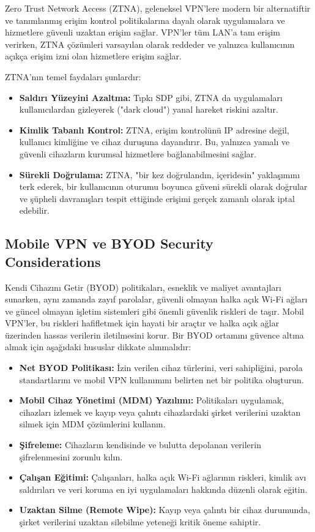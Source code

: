 Zero Trust Network Access (ZTNA), geleneksel VPN'lere modern bir alternatiftir ve tanımlanmış erişim kontrol politikalarına dayalı olarak uygulamalara ve hizmetlere güvenli uzaktan erişim sağlar. VPN'ler tüm LAN'a tam erişim verirken, ZTNA çözümleri varsayılan olarak reddeder ve yalnızca kullanıcının açıkça erişim izni olan hizmetlere erişim sağlar.

ZTNA'nın temel faydaları şunlardır:

\begin{itemize}
\item \textbf{Saldırı Yüzeyini Azaltma:} Tıpkı SDP gibi, ZTNA da uygulamaları kullanıcılardan gizleyerek ("dark cloud") yanal hareket riskini azaltır.
\item \textbf{Kimlik Tabanlı Kontrol:} ZTNA, erişim kontrolünü IP adresine değil, kullanıcı kimliğine ve cihaz duruşuna dayandırır. Bu, yalnızca yamalı ve güvenli cihazların kurumsal hizmetlere bağlanabilmesini sağlar.
\item \textbf{Sürekli Doğrulama:} ZTNA, "bir kez doğrulandın, içeridesin" yaklaşımını terk ederek, bir kullanıcının oturumu boyunca güveni sürekli olarak doğrular ve şüpheli davranışları tespit ettiğinde erişimi gerçek zamanlı olarak iptal edebilir.
\end{itemize}

\subsection{Mobile VPN ve BYOD Security Considerations}

Kendi Cihazını Getir (BYOD) politikaları, esneklik ve maliyet avantajları sunarken, aynı zamanda zayıf parolalar, güvenli olmayan halka açık Wi-Fi ağları ve güncel olmayan işletim sistemleri gibi önemli güvenlik riskleri de taşır. Mobil VPN'ler, bu riskleri hafifletmek için hayati bir araçtır ve halka açık ağlar üzerinden hassas verilerin iletilmesini korur.
Bir BYOD ortamını güvence altına almak için aşağıdaki hususlar dikkate alınmalıdır:

\begin{itemize}
\item \textbf{Net BYOD Politikası:} İzin verilen cihaz türlerini, veri sahipliğini, parola standartlarını ve mobil VPN kullanımını belirten net bir politika oluşturun.
\item \textbf{Mobil Cihaz Yönetimi (MDM) Yazılımı:} Politikaları uygulamak, cihazları izlemek ve kayıp veya çalıntı cihazlardaki şirket verilerini uzaktan silmek için MDM çözümlerini kullanın.
\item \textbf{Şifreleme:} Cihazların kendisinde ve bulutta depolanan verilerin şifrelenmesini zorunlu kılın.
\item \textbf{Çalışan Eğitimi:} Çalışanları, halka açık Wi-Fi ağlarının riskleri, kimlik avı saldırıları ve veri koruma en iyi uygulamaları hakkında düzenli olarak eğitin.
\item \textbf{Uzaktan Silme (Remote Wipe):} Kayıp veya çalıntı bir cihaz durumunda, şirket verilerini uzaktan silebilme yeteneği kritik öneme sahiptir.
\end{itemize}

